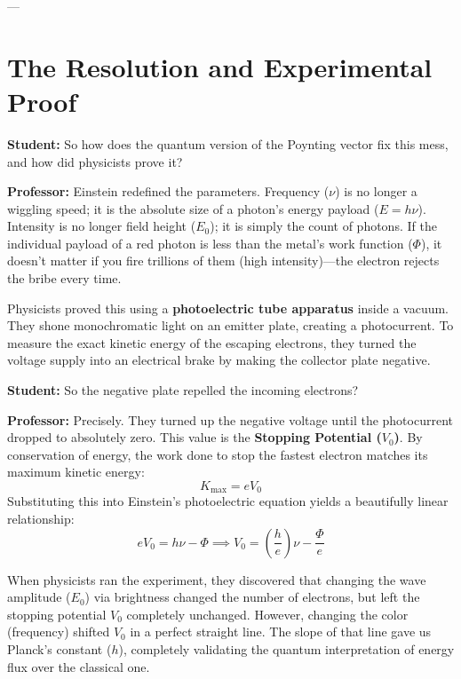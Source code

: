 \documentclass[11pt,a4paper]{article}
\newcommand{\Professor}{\noindent\textbf{\textcolor{profcolor}{Professor:}} }
\newcommand{\Student}{\noindent\textbf{\textcolor{studcolor}{Student:}} }
\begin{document}
	---
	
	\section{The Resolution and Experimental Proof}
	
	\Student So how does the quantum version of the Poynting vector fix this mess, and how did physicists prove it?
	
	\Professor Einstein redefined the parameters. Frequency ($\nu$) is no longer a wiggling speed; it is the absolute size of a photon's energy payload ($E=h\nu$). Intensity is no longer field height ($E_0$); it is simply the count of photons. If the individual payload of a red photon is less than the metal's work function ($\Phi$), it doesn't matter if you fire trillions of them (high intensity)—the electron rejects the bribe every time. 
	
	Physicists proved this using a \textbf{photoelectric tube apparatus} inside a vacuum. They shone monochromatic light on an emitter plate, creating a photocurrent. To measure the exact kinetic energy of the escaping electrons, they turned the voltage supply into an electrical brake by making the collector plate negative.
	
	\Student So the negative plate repelled the incoming electrons?
	
	\Professor Precisely. They turned up the negative voltage until the photocurrent dropped to absolutely zero. This value is the \textbf{Stopping Potential ($V_0$)}. By conservation of energy, the work done to stop the fastest electron matches its maximum kinetic energy:
	\begin{equation}
		K_{\text{max}} = e V_0
	\end{equation}
	Substituting this into Einstein's photoelectric equation yields a beautifully linear relationship:
	\begin{equation}
		e V_0 = h\nu - \Phi \implies V_0 = \left(\frac{h}{e}\right)\nu - \frac{\Phi}{e}
	\end{equation}
	
	When physicists ran the experiment, they discovered that changing the wave amplitude ($E_0$) via brightness changed the number of electrons, but left the stopping potential $V_0$ completely unchanged. However, changing the color (frequency) shifted $V_0$ in a perfect straight line. The slope of that line gave us Planck's constant ($h$), completely validating the quantum interpretation of energy flux over the classical one.
	
\end{document}
